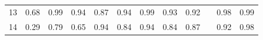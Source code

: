 \documentclass[twoside,11pt]{article}
\begin{document}
\begin{table}[H]
{\begin{tabular}{ccccccccclcc}
\multicolumn{1}{|c|}{13}                                                                          & \multicolumn{1}{c|}{0.68}                                                           & \multicolumn{1}{c|}{\cellcolor[HTML]{FFCCC9}0.99}                                              & \multicolumn{1}{c|}{\cellcolor[HTML]{ECF4FF}0.94}                                        & \multicolumn{1}{c|}{0.87}                                                                & \multicolumn{1}{c|}{\cellcolor[HTML]{ECF4FF}0.94}                                        & \multicolumn{1}{c|}{\cellcolor[HTML]{FFCCC9}0.99}                                           & \multicolumn{1}{c|}{0.93}                                                                   & \multicolumn{1}{c|}{0.92}                                                                   & \multicolumn{1}{l|}{}                    & \multicolumn{1}{c|}{0.98}                                                                      & \multicolumn{1}{c|}{0.99}                                                                      \\ \cline{1-1}
\multicolumn{1}{|c|}{14}                                                                          & \multicolumn{1}{c|}{0.29}                                                           & \multicolumn{1}{c|}{0.79}                                                                      & \multicolumn{1}{c|}{0.65}                                                                & \multicolumn{1}{c|}{\cellcolor[HTML]{FFCCC9}0.94}                                        & \multicolumn{1}{c|}{0.84}                                                                & \multicolumn{1}{c|}{\cellcolor[HTML]{FFCCC9}0.94}                                           & \multicolumn{1}{c|}{0.84}                                                                   & \multicolumn{1}{c|}{\cellcolor[HTML]{ECF4FF}0.87}                                           & \multicolumn{1}{l|}{}                    & \multicolumn{1}{c|}{0.92}                                                                      & \multicolumn{1}{c|}{0.98}                                                                      \\ \cline{1-1}

\end{tabular}}
\end{table}
\end{document}
